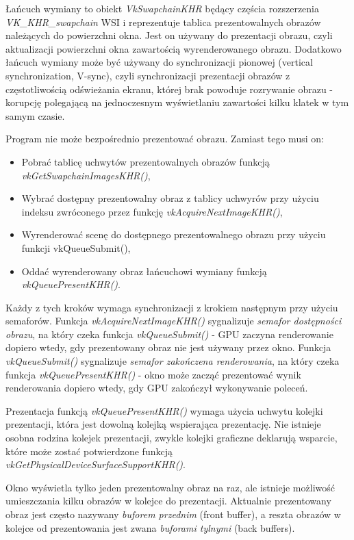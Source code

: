 Łańcuch wymiany to obiekt \textit{VkSwapchainKHR} będący częścia rozszerzenia \textit{VK\_KHR\_swapchain} WSI i reprezentuje tablica prezentowalnych obrazów należących do powierzchni okna.
Jest on używany do prezentacji obrazu, czyli aktualizacji powierzchni okna zawartością wyrenderowanego obrazu.
Dodatkowo łańcuch wymiany może być używany do synchronizacji pionowej (vertical synchronization, V-sync), czyli synchronizacji prezentacji obrazów z częstotliwością
odświeżania ekranu, której brak powoduje rozrywanie obrazu - korupcję polegającą na jednoczesnym wyświetlaniu zawartości
kilku klatek w tym samym czasie.

Program nie może bezpośrednio prezentować obrazu. Zamiast tego musi on:
\begin{itemize}
	\item Pobrać tablicę uchwytów prezentowalnych obrazów funkcją \textit{vkGetSwapchainImagesKHR()},
	\item Wybrać dostępny prezentowalny obraz z tablicy uchwyrów przy użyciu indeksu zwróconego przez funkcję \textit{vkAcquireNextImageKHR()},
	\item Wyrenderować scenę do dostępnego prezentowalnego obrazu przy użyciu funkcji vkQueueSubmit(),
	\item Oddać wyrenderowany obraz łańcuchowi wymiany funkcją \textit{vkQueuePresentKHR()}.
\end{itemize}
Każdy z tych kroków wymaga synchronizacji z krokiem następnym przy użyciu semaforów. Funkcja \textit{vkAcquireNextImageKHR()} sygnalizuje \textit{semafor dostępności obrazu}, na który czeka funkcja \textit{vkQueueSubmit()} - GPU zaczyna renderowanie dopiero wtedy, gdy prezentowany obraz nie jest używany przez okno.
Funkcja \textit{vkQueueSubmit()} sygnalizuje \textit{semafor zakończena renderowania}, na który czeka funkcja \textit{vkQueuePresentKHR()} - okno może zacząć prezentować wynik renderowania dopiero wtedy, gdy GPU zakończył wykonywanie poleceń.

Prezentacja funkcją \textit{vkQueuePresentKHR()} wymaga użycia uchwytu kolejki prezentacji, która jest dowolną kolejką wspierająca prezentację.
Nie istnieje osobna rodzina kolejek prezentacji, zwykle kolejki graficzne deklarują wsparcie, które może zostać potwierdzone funkcją \textit{vkGetPhysicalDeviceSurfaceSupportKHR()}.

Okno wyświetla tylko jeden prezentowalny obraz na raz, ale istnieje możliwość umieszczania kilku obrazów w kolejce do
prezentacji. Aktualnie prezentowany obraz jest często nazywany \textit{buforem przednim} (front buffer), a reszta obrazów w kolejce od prezentowania jest zwana \textit{buforami tylnymi} (back buffers).


